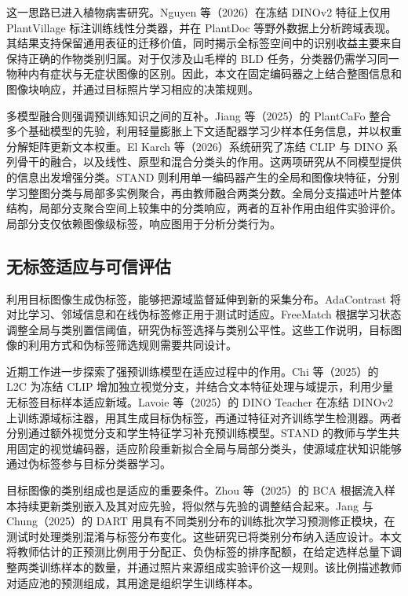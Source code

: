 \documentclass[11pt,a4paper,UTF8,fontset=windows,scheme=plain]{ctexart}
\begin{document}
这一思路已进入植物病害研究。Nguyen 等（2026）在冻结 DINOv2 特征上仅用 PlantVillage 标注训练线性分类器，并在 PlantDoc 等野外数据上分析跨域表现\cite{nguyen2026}。其结果支持保留通用表征的迁移价值，同时揭示全标签空间中的识别收益主要来自保持正确的作物类别归属。对于仅涉及山毛榉的 BLD 任务，分类器仍需学习同一物种内有症状与无症状图像的区别。因此，本文在固定编码器之上结合整图信息和图像块响应，并通过目标照片学习相应的决策规则。

多模型融合则强调预训练知识之间的互补。Jiang 等（2025）的 PlantCaFo 整合多个基础模型的先验，利用轻量膨胀上下文适配器学习少样本任务信息，并以权重分解矩阵更新文本权重\cite{jiang2025}。El Karch 等（2026）系统研究了冻结 CLIP 与 DINO 系列骨干的融合，以及线性、原型和混合分类头的作用\cite{elkarch2026}。这两项研究从不同模型提供的信息出发增强分类。STAND 则利用单一编码器产生的全局和图像块特征，分别学习整图分类与局部多实例聚合，再由教师融合两类分数。全局分支描述叶片整体结构，局部分支聚合空间上较集中的分类响应，两者的互补作用由组件实验评价。局部分支仅依赖图像级标签，响应图用于分析分类行为。

\subsection{无标签适应与可信评估}
利用目标图像生成伪标签，能够把源域监督延伸到新的采集分布。AdaContrast 将对比学习、邻域信息和在线伪标签修正用于测试时适应\cite{chen2022}。FreeMatch 根据学习状态调整全局与类别置信阈值，研究伪标签选择与类别公平性\cite{wang2023}。这些工作说明，目标图像的利用方式和伪标签筛选规则需要共同设计。

近期工作进一步探索了强预训练模型在适应过程中的作用。Chi 等（2025）的 L2C 为冻结 CLIP 增加独立视觉分支，并结合文本特征处理与域提示，利用少量无标签目标样本适应新域\cite{chi2025}。Lavoie 等（2025）的 DINO Teacher 在冻结 DINOv2 上训练源域标注器，用其生成目标伪标签，再通过特征对齐训练学生检测器\cite{lavoie2025}。两者分别通过额外视觉分支和学生特征学习补充预训练模型。STAND 的教师与学生共用固定的视觉编码器，适应阶段重新拟合全局与局部分类头，使源域症状知识能够通过伪标签参与目标分类器学习。

目标图像的类别组成也是适应的重要条件。Zhou 等（2025）的 BCA 根据流入样本持续更新类别嵌入及其对应先验，将似然与先验的调整结合起来\cite{zhou2025}。Jang 与 Chung（2025）的 DART 用具有不同类别分布的训练批次学习预测修正模块，在测试时处理类别混淆与标签分布变化\cite{jang2025}。这些研究已将类别分布纳入适应设计。本文将教师估计的正预测比例用于分配正、负伪标签的排序配额，在给定选样总量下调整两类训练样本的数量，并通过照片来源组成实验评价这一规则。该比例描述教师对适应池的预测组成，其用途是组织学生训练样本。
\end{document}
